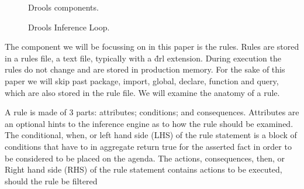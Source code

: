 \begin{figure}[h]
    \centering
    \caption{Drools components.}
    \label{fig:Drools_components}
\end{figure}

\begin{figure}[h]
    \centering
    \caption{Drools Inference Loop.}
    \label{fig:Drools_inference_loop}
\end{figure}


The component we will be focussing on in this paper is the rules.
Rules are stored in a rules file, a text file, typically with a \.drl extension.
During execution the rules do not change and are stored in production memory.
For the sake of this paper we will skip past package, import, global, declare, function and query, which are also stored in the rule file.
We will examine the anatomy of a rule.

A rule is made of 3 parts: attributes; conditions; and consequences.
Attributes are an optional hints to the inference engine as to how the rule should be examined.
The conditional, when, or left hand side (LHS) of the rule statement is a block of conditions that have to in aggregate return true for the asserted fact in order to be considered to be placed on the agenda.
The actions, consequences, then, or Right hand side (RHS) of the rule statement contains actions to be executed, should the rule be filtered

